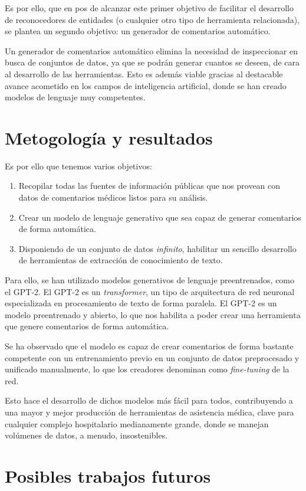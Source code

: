 Es por ello, que en pos de alcanzar este primer objetivo de facilitar el desarrollo de reconocedores de entidades (o cualquier otro tipo de herramienta relacionada), se plantea un segundo objetivo: un generador de comentarios automático.

Un generador de comentarios automático elimina la necesidad de inspeccionar en busca de conjuntos de datos, ya que se podrán generar cuantos se deseen, de cara al desarrollo de las herramientas. Esto es además viable gracias al destacable avance acometido en los campos de inteligencia artificial, donde se han creado modelos de lenguaje muy competentes.


\section{Metogología y resultados}
Es por ello que tenemos varios objetivos: 
\begin{enumerate}
	\item Recopilar todas las fuentes de información públicas que nos provean con datos de comentarios médicos listos para su análisis.
	\item Crear un modelo de lenguaje generativo que sea capaz de generar comentarios de forma automática.
	\item Disponiendo de un conjunto de datos \textit{infinito}, habilitar un sencillo desarrollo de herramientas de extracción de conocimiento de texto.
\end{enumerate}

Para ello, se han utilizado modelos generativos de lenguaje preentrenados, como el GPT-2. El GPT-2 es un \textit{transformer}, un tipo de arquitectura de red neuronal especializada en procesamiento de texto de forma paralela. El GPT-2 es un modelo preentrenado y abierto, lo que nos habilita a poder crear una herramienta que genere comentarios de forma automática.

Se ha observado que el modelo es capaz de crear comentarios de forma bastante competente con un entrenamiento previo en un conjunto de datos preprocesado y unificado manualmente, lo que los creadores denominan como \textit{fine-tuning} de la red. 

Esto hace el desarrollo de dichos modelos más fácil para todos, contribuyendo a una mayor y mejor producción de herramientas de asistencia médica, clave para cualquier complejo hospitalario medianamente grande, donde se manejan volúmenes de datos, a menudo, insostenibles.

\section{Posibles trabajos futuros}


